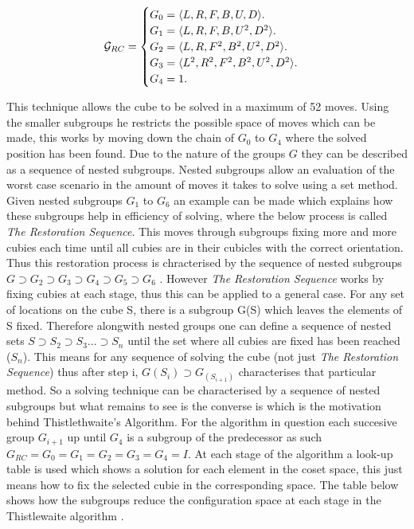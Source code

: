 \documentclass{article}
\DeclarePairedDelimiter{\opair}{\langle}{\rangle}
\newcounter{lem}[section]\setcounter{lem}{0}
\begin{document}
\begin{equation}
  \mathcal{G}_{RC}=\begin{cases}
    G_{0} = \text{$\opair{L,R,F,B,U,D}$}.\\
    G_{1} = \text{$\opair{L,R,F,B,U^{2},D^{2}}$}.\\
    G_{2} = \text{$\opair{L,R,F^{2},B^{2},U^{2},D^{2}}$}.\\
    G_{3} = \text{$\opair{L^{2},R^{2},F^{2},B^{2},U^{2},D^{2}}$}.\\
    G_{4} = \text{1}.
  \end{cases}
\end{equation}

This technique allows the cube to be solved in a maximum of 52 moves. Using the smaller subgroups he restricts the possible space of moves which can be made, this works by moving down the chain of $G_{0}$ to $G_{4}$ where the solved position has been found. Due to the nature of the groups $G$ they can be described as a sequence of nested subgroups. Nested subgroups allow an evaluation of the worst case scenario in the amount of moves it takes to solve using a set method. Given nested subgroups $G_1$ to $G_6$ an example can be made which explains how these subgroups help in efficiency of solving, where the below process is called \textit{The Restoration Sequence}. This moves through subgroups fixing more and more cubies each time until all cubies are in their cubicles with the correct orientation. Thus this restoration process is chracterised by the sequence of nested subgroups $G \supset G_2 \supset G_3 \supset G_4 \supset G_5 \supset G_6 $ \cite{alexander1982handbook}.
However \textit{The Restoration Sequence} works by fixing cubies at each stage, thus this can be applied to a general case. For any set of locations on the cube S, there is a subgroup G(S) which leaves the elements of S fixed. Therefore alongwith nested groups one can define a sequence of nested sets $S \supset S_2 \supset S_3 ... \supset S_n $ until the set where all cubies are fixed has been reached ($S_n$). This means for any sequence of solving the cube (not just \textit{The Restoration Sequence}) thus after step i, $G(S_i) \supset G_(S_{i+1})$ characterises that particular method. So a solving technique can be characterised by a sequence of nested subgroups but what remains to see is the converse is which is the motivation behind Thistlethwaite's Algorithm. For the algorithm in question each succesive group $G_{i+1}$ up until $G_4$ is a subgroup of the predecessor as such $G_{RC} = G_0 = G_1 = G_2 = G_3 = G_4= I$. At each stage of the algorithm a look-up table is used which shows a solution for each element in the coset space, this just means how to fix the selected cubie in the corresponding space. The table below shows how the subgroups reduce the configuration space at each stage in the Thistlewaite algorithm \cite{Thistlethwaite}.
\end{document}
